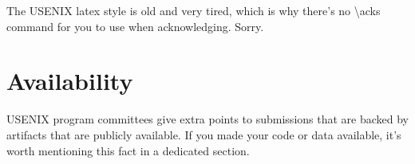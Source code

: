 The USENIX latex style is old and very tired, which is why
there's no \textbackslash{}acks command for you to use when
acknowledging. Sorry.

\section*{Availability}

USENIX program committees give extra points to submissions that are
backed by artifacts that are publicly available. If you made your code
or data available, it's worth mentioning this fact in a dedicated
section.






